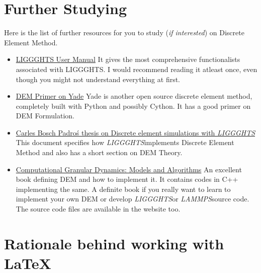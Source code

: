 \documentclass{tufte-book} %
\newcommand{\Li}{\textit{LIGGGHTS}}
\newcommand{\La}{\textit{LAMMPS}}
\begin{document}
\section{Further Studying}
Here is the list of further resources for you to study (\textit{if interested}) on Discrete Element Method.
\begin{itemize}
\item \href{http://www.cfdem.com/media/DEM/docu/Manual.html}{LIGGGHTS User Manual}
  It gives the most comprehensive functionalists associated with LIGGGHTS. I would recommend reading it atleast once, even though you might not understand everything at first.

\item \href{https://yade-dem.org/doc/formulation.html}{DEM Primer on Yade}
  Yade is another open source discrete element method, completely built with Python and possibly Cython. It has a good primer on DEM Formulation. 
\item \href{http://www.cimne.com/cvdata/cntr2/spc31/dtos/img/mdia/thesis/CarlesBosch.pdf}{Carles Bosch Padro\'s thesis on Discrete element simulations with \Li}
  This document specifies how \Li implements Discrete Element Method and also has a short section on DEM Theory. 
\item \href{www.springer.com/us/book/9783540214854}{Computational Granular Dynamics: Models and Algorithms}
  An excellent book defining DEM and how to implement it. It contains codes in C++ implementing the same. A definite book if you really want to learn to implement your own DEM or develop \Li or \La source code. The source code files are available in the website too. 
\end{itemize}

\section{Rationale behind working with \LaTeX}
\end{document}
